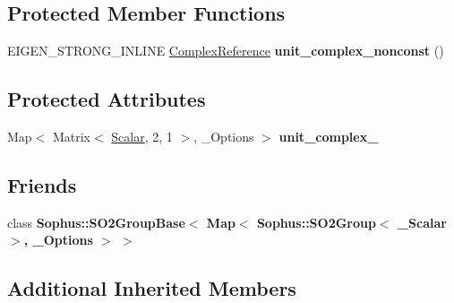 \subsection*{Protected Member Functions}
\begin{DoxyCompactItemize}
\item 
E\+I\+G\+E\+N\+\_\+\+S\+T\+R\+O\+N\+G\+\_\+\+I\+N\+L\+I\+NE \hyperlink{class_sophus_1_1_s_o2_group_base_adad5730f4c0387415b8dfc3c5aa8b8f2}{Complex\+Reference} {\bfseries unit\+\_\+complex\+\_\+nonconst} ()\hypertarget{class_eigen_1_1_map_3_01_sophus_1_1_s_o2_group_3_01___scalar_01_4_00_01___options_01_4_ad637c564d4e231a16f971791309ed864}{}\label{class_eigen_1_1_map_3_01_sophus_1_1_s_o2_group_3_01___scalar_01_4_00_01___options_01_4_ad637c564d4e231a16f971791309ed864}

\end{DoxyCompactItemize}
\subsection*{Protected Attributes}
\begin{DoxyCompactItemize}
\item 
Map$<$ Matrix$<$ \hyperlink{class_sophus_1_1_s_o2_group_base_a075b701502715aecf0bdb3464963d36c}{Scalar}, 2, 1 $>$, \+\_\+\+Options $>$ {\bfseries unit\+\_\+complex\+\_\+}\hypertarget{class_eigen_1_1_map_3_01_sophus_1_1_s_o2_group_3_01___scalar_01_4_00_01___options_01_4_a2318aec787c38165fb7fecfbcd3a7351}{}\label{class_eigen_1_1_map_3_01_sophus_1_1_s_o2_group_3_01___scalar_01_4_00_01___options_01_4_a2318aec787c38165fb7fecfbcd3a7351}

\end{DoxyCompactItemize}
\subsection*{Friends}
\begin{DoxyCompactItemize}
\item 
class {\bfseries Sophus\+::\+S\+O2\+Group\+Base$<$ Map$<$ Sophus\+::\+S\+O2\+Group$<$ \+\_\+\+Scalar $>$, \+\_\+\+Options $>$ $>$}\hypertarget{class_eigen_1_1_map_3_01_sophus_1_1_s_o2_group_3_01___scalar_01_4_00_01___options_01_4_aea5acf253f378df2d3e992e737e6245f}{}\label{class_eigen_1_1_map_3_01_sophus_1_1_s_o2_group_3_01___scalar_01_4_00_01___options_01_4_aea5acf253f378df2d3e992e737e6245f}

\end{DoxyCompactItemize}
\subsection*{Additional Inherited Members}



